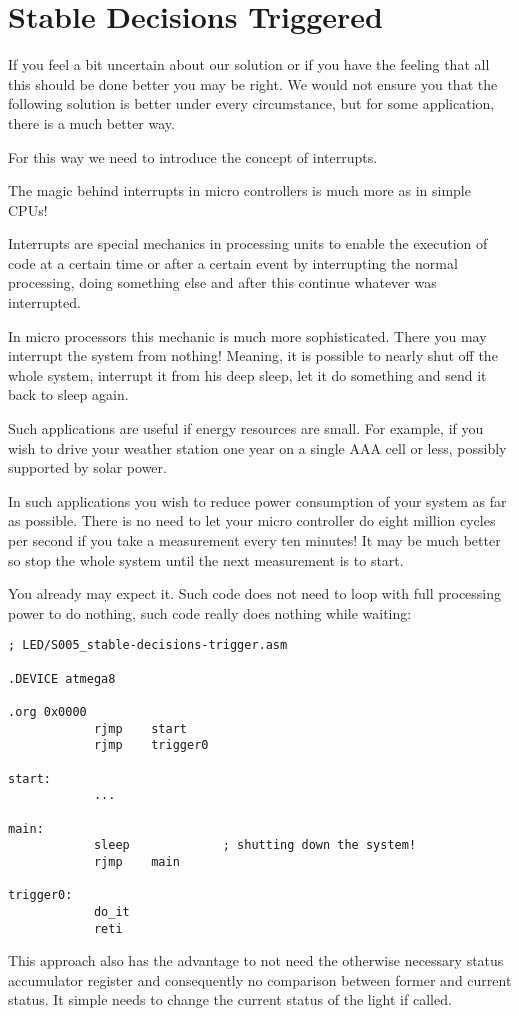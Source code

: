 \section{Stable Decisions Triggered}

If you feel a bit uncertain about our solution or if you have the feeling that all this should be done better you may be right. We would not ensure you that the following solution is better under every circumstance, but for some application, there is a much better way.

For this way we need to introduce the concept of interrupts.

The magic behind interrupts in micro controllers is much more as in simple CPUs!

Interrupts are special mechanics in processing units to enable the execution of code at a certain time or after a certain event by interrupting the normal processing, doing something else and after this continue whatever was interrupted.

In micro processors this mechanic is much more sophisticated. There you may interrupt the system from nothing! Meaning, it is possible to nearly shut off the whole system, interrupt it from his deep sleep, let it do something and send it back to sleep again.

Such applications are useful if energy resources are small. For example, if you wish to drive your weather station one year on a single AAA cell or less, possibly supported by solar power.

In such applications you wish to reduce power consumption of your system as far as possible. There is no need to let your micro controller do eight million cycles per second if you take a measurement every ten minutes! It may be much better so stop the whole system until the next measurement is to start.

You already may expect it. Such code does not need to loop with full processing power to do nothing, such code really does nothing while waiting:

\begin{lstlisting}
; LED/S005_stable-decisions-trigger.asm

.DEVICE atmega8

.org 0x0000
            rjmp    start
            rjmp    trigger0
            
start:
            ...
            
main:
            sleep             ; shutting down the system!
            rjmp    main

trigger0:
            do_it
            reti
\end{lstlisting}

This approach also has the advantage to not need the otherwise necessary status accumulator register and consequently no comparison between former and current status. It simple needs to change the current status of the light if called.

